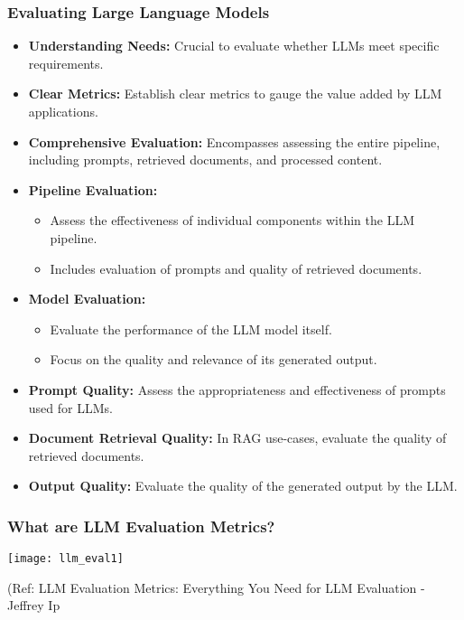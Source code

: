 \begin{frame}[fragile]\frametitle{Evaluating Large Language Models}
  \begin{itemize}
    \item \textbf{Understanding Needs:} Crucial to evaluate whether LLMs meet specific requirements.
    \item \textbf{Clear Metrics:} Establish clear metrics to gauge the value added by LLM applications.
    \item \textbf{Comprehensive Evaluation:} Encompasses assessing the entire pipeline, including prompts, retrieved documents, and processed content.
    \item \textbf{Pipeline Evaluation:}
      \begin{itemize}
        \item Assess the effectiveness of individual components within the LLM pipeline.
        \item Includes evaluation of prompts and quality of retrieved documents.
      \end{itemize}
    \item \textbf{Model Evaluation:}
      \begin{itemize}
        \item Evaluate the performance of the LLM model itself.
        \item Focus on the quality and relevance of its generated output.
      \end{itemize}
    \item \textbf{Prompt Quality:} Assess the appropriateness and effectiveness of prompts used for LLMs.
    \item \textbf{Document Retrieval Quality:} In RAG use-cases, evaluate the quality of retrieved documents.
    \item \textbf{Output Quality:} Evaluate the quality of the generated output by the LLM.
  \end{itemize}
\end{frame}



\begin{frame}[fragile]\frametitle{What are LLM Evaluation Metrics?}


\begin{center}
\texttt{[image: llm\_eval1]}
\end{center}		
		
{\tiny (Ref: LLM Evaluation Metrics: Everything You Need for LLM Evaluation - Jeffrey Ip}
			
			
\end{frame}

